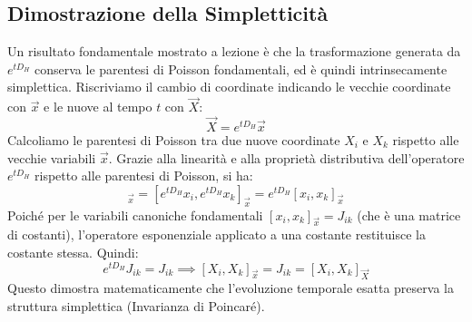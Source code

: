 \documentclass[12pt,a4paper]{article}
\begin{document}
\subsection{Dimostrazione della Simpletticità}
Un risultato fondamentale mostrato a lezione è che la trasformazione generata da $e^{t D_H}$ conserva le parentesi di Poisson fondamentali, ed è quindi intrinsecamente simplettica. 
Riscriviamo il cambio di coordinate indicando le vecchie coordinate con $\vec{x}$ e le nuove al tempo $t$ con $\vec{X}$:
\begin{equation}
\vec{X} = e^{t D_H} \vec{x}
\end{equation}
Calcoliamo le parentesi di Poisson tra due nuove coordinate $X_i$ e $X_k$ rispetto alle vecchie variabili $\vec{x}$. Grazie alla linearità e alla proprietà distributiva dell'operatore $e^{t D_H}$ rispetto alle parentesi di Poisson, si ha:
\begin{equation}
[X_i, X_k]_{\vec{x}} = \left[ e^{t D_H} x_i, e^{t D_H} x_k \right]_{\vec{x}} = e^{t D_H} [x_i, x_k]_{\vec{x}}
\end{equation}
Poiché per le variabili canoniche fondamentali $[x_i, x_k]_{\vec{x}} = J_{ik}$ (che è una matrice di costanti), l'operatore esponenziale applicato a una costante restituisce la costante stessa. Quindi:
\begin{equation}
e^{t D_H} J_{ik} = J_{ik} \implies [X_i, X_k]_{\vec{x}} = J_{ik} = [X_i, X_k]_{\vec{X}}
\end{equation}
Questo dimostra matematicamente che l'evoluzione temporale esatta preserva la struttura simplettica (Invarianza di Poincaré).
\end{document}
